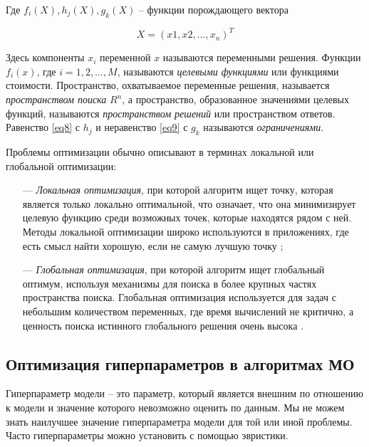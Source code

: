 Где $f_i(X), h_j(X), g_k(X)$ -- функции порождающего вектора

\begin{equation}\label{eq10}
    X = (x1,x2,\dots,x_n)^T
\end{equation}

Здесь компоненты $x_i$ переменной $x$ называются переменными решения.
Функции $f_i(x)$, где $i = 1, 2, \dots, M$, называются \emph{целевыми функциями}
или функциями стоимости. Пространство, охватываемое переменные решения,
называется \emph{пространством поиска} $R^n$, а пространство, образованное значениями
целевых функций, называются \emph{пространством решений} или пространством ответов.
Равенство \eqref{eq8} с $h_j$ и неравенство \eqref{eq9} с $g_k$ называются \emph{ограничениями}.

Проблемы оптимизации обычно описывают в терминах локальной или глобальной
оптимизации:

\begin{itemize}
    \item[—]
        \emph{Локальная оптимизация}, при которой алгоритм ищет точку, которая является
        только локально оптимальной, что означает, что она минимизирует целевую
        функцию среди возможных точек, которые находятся рядом с ней. Методы локальной оптимизации широко используются в приложениях, где есть смысл
        найти хорошую, если не самую лучшую точку \cite{Boyd2004};

    \item[—]
        \emph{Глобальная оптимизация}, при которой алгоритм ищет глобальный оптимум,
        используя механизмы для поиска в более крупных частях пространства поиска.
        Глобальная оптимизация используется для задач с небольшим количеством
        переменных, где время вычислений не критично, а ценность поиска истинного
        глобального решения очень высока \cite{Boyd2004}.
\end{itemize}

\subsection{Оптимизация гиперпараметров в алгоритмах МО}\label{optimization}

Гиперпараметр модели -- это параметр, который является внешним по
отношению к модели и значение которого невозможно оценить по данным.
Мы не можем знать наилучшее значение гиперпараметра модели для той или иной проблемы.
Часто гиперпараметры можно установить с помощью эвристики.

